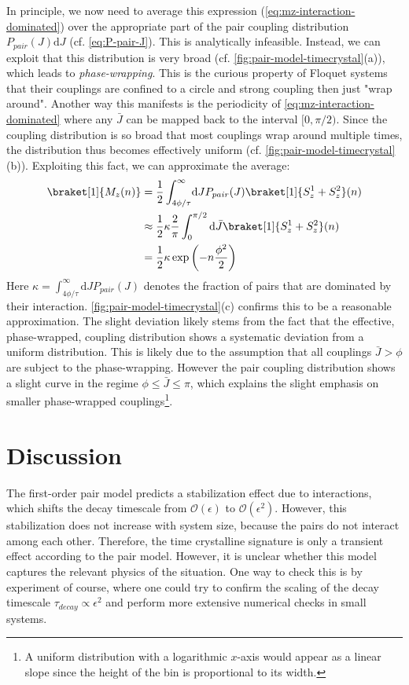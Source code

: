 In principle, we now need to average this expression (\autoref{eq:mz-interaction-dominated}) over the appropriate part of the pair coupling distribution $P_{pair}(J)\mathrm{d}J$ (cf. \autoref{eq:P-pair-J}). This is analytically infeasible. Instead, we can exploit that this distribution is very broad (cf. \autoref{fig:pair-model-timecrystal}(a)), which leads to \emph{phase-wrapping}. This is the curious property of Floquet systems that their couplings are confined to a circle and strong coupling then just "wrap around".  Another way this manifests is the periodicity of \autoref{eq:mz-interaction-dominated} where any $\bar{J}$ can be mapped back to the interval $[0,\pi/2)$. Since the coupling distribution is so broad that most couplings wrap around multiple times, the distribution thus becomes effectively uniform (cf. \autoref{fig:pair-model-timecrystal}(b)). Exploiting this fact, we can approximate the average:
\begin{align}
	\braket[1]{M_z(n)} &= \frac{1}{2}\int_{4\phi/\tau}^\infty\!\mathrm{d}J P_{pair}(J) \braket[1]{S_z^1+S_z^2}(n) \\
	&\approx \frac{1}{2} \kappa \frac{2}{\pi}\int_{0}^{\pi/2} \mathrm{d}\bar{J} \braket[1]{S_z^1+S_z^2}(n) \\
	&= \frac{1}{2} \kappa \exp\left(-n\frac{\phi^2}2\right)
\end{align}
Here $\kappa=\int_{4\phi/\tau}^{\infty}\!\mathrm{d}JP_{pair}(J)$ denotes the fraction of pairs that are dominated by their interaction. \autoref{fig:pair-model-timecrystal}(c) confirms this to be a reasonable approximation. The slight deviation likely stems from the fact that the effective, phase-wrapped, coupling distribution shows a systematic deviation from a uniform distribution. This is likely due to the assumption that all couplings $\bar{J}>\phi$ are subject to the phase-wrapping. However the pair coupling distribution shows a slight curve in the regime $\phi\leq\bar{J}\leq\pi$, which explains the slight emphasis on smaller phase-wrapped couplings\footnote{A uniform distribution with a logarithmic $x$-axis would appear as a linear slope since the height of the bin is proportional to its width.}.

\section{Discussion}
The first-order pair model predicts a stabilization effect due to interactions, which shifts the decay timescale from $\mathcal{O}(\epsilon)$ to $\mathcal{O}(\epsilon^2)$. However, this stabilization does not increase with system size, because the pairs do not interact among each other. Therefore, the time crystalline signature is only a transient effect according to the pair model. However, it is unclear whether this  model captures the relevant physics of the situation. One way to check this is by experiment of course, where one could try to confirm the scaling of the decay timescale $\tau_{decay}\propto\epsilon^2$ and perform more extensive numerical checks in small systems.

